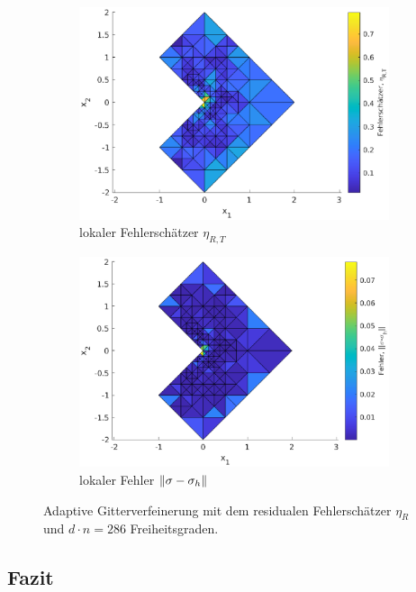 \documentclass{scrartcl}
\DeclarePairedDelimiter{\norm}{\lVert}{\rVert}
\begin{document}
\begin{figure}[h]
\begin{subfigure}[b]{0.45\textwidth}
\centering
\includegraphics[width=\textwidth]{Plots/LShapeBenchmarkLocaletaR286}
\caption{lokaler Fehlerschätzer $\eta_{R,T}$}
\label{pl:LShapeLocaletaR286}
\end{subfigure}
\hfill
\begin{subfigure}[b]{0.45\textwidth}
\centering
\includegraphics[width=\textwidth]{Plots/LShapeBenchmarkLocalNormSigDiff286}
\caption{lokaler Fehler $\norm{\sigma-\sigma_h}$}
\end{subfigure}
\caption{Adaptive Gitterverfeinerung mit dem residualen Fehlerschätzer $\eta_R$ und $d\cdot n=286$ Freiheitsgraden.}
\label{pl:LShapeLocalNormSigDiff286}
\end{figure}

\newpage
\subsection{Fazit}
\end{document}
